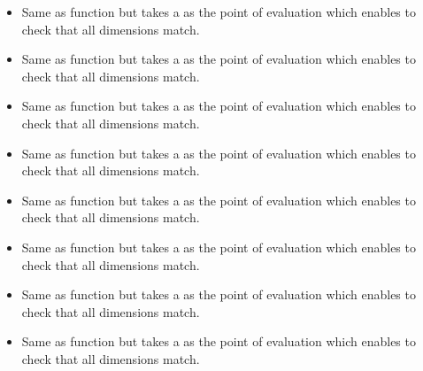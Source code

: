 \begin{itemize}
\item {}
  \sshortdescribe Same as function  but takes a
   as the point of evaluation which enables to check that all
  dimensions match.
\item {}
  \sshortdescribe Same as function  but takes a
   as the point of evaluation which enables to check that all
  dimensions match.
\item {}
  \sshortdescribe Same as function  but takes a
   as the point of evaluation which enables to check that all
  dimensions match.
\item {}
  \sshortdescribe Same as function  but takes a
   as the point of evaluation which enables to check that all
  dimensions match.
\item {}
  \sshortdescribe Same as function  but takes a
   as the point of evaluation which enables to check that all
  dimensions match.
\item {}
  \sshortdescribe Same as function  but takes a
   as the point of evaluation which enables to check that all
  dimensions match.
\item {}
  \sshortdescribe Same as function  but takes a
   as the point of evaluation which enables to check that all
  dimensions match.
\item {}
  \sshortdescribe Same as function  but takes a
   as the point of evaluation which enables to check that all
  dimensions match.
\end{itemize}



